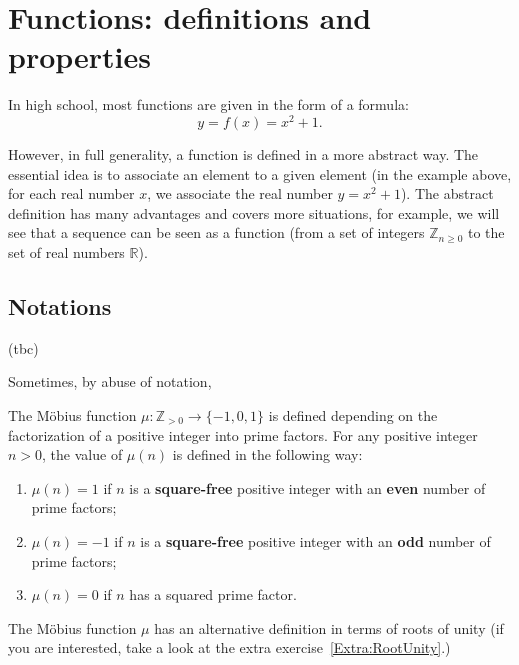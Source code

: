 \documentclass[
	fontsize=10pt, %
	twoside=true, %
	secnumdepth=1, %
	numbers=noenddot, %
]{kaobook}
\begin{document}

\chapter{Functions: definitions and properties}
In high school, most functions are given in the form of a formula:
\begin{equation*}
y=f(x)=x^{2}+1.
\end{equation*}

However, in full generality, a function is defined in a more abstract way. The essential idea is to associate an element to a given element (in the example above, for each real number $x$, we associate the real number $y=x^2+1$). The abstract definition has many advantages and covers more situations, for example, we will see that a sequence can be seen as a function (from a set of integers $\mathbb{Z}_{n\geq 0}$ to the set of real numbers $\mathbb{R}$).

\section{Notations}

(tbc)

Sometimes, by abuse of notation,

\begin{example}
The Möbius function $\mu:\mathbb{Z}_{>0}\to\{-1,0,1\}$ is defined depending on the factorization of a positive integer into prime factors. For any positive integer $n>0$, the value of $\mu(n)$ is defined in the following way:
\begin{enumerate}
	\item $\mu(n)=1$ if $n$ is a \textbf{square-free} positive integer with an \textbf{even} number of prime factors;
	\item $\mu(n)=-1$ if $n$ is a \textbf{square-free} positive integer with an \textbf{odd} number of prime factors;
	\item $\mu(n)=0$ if $n$ has a squared prime factor.
\end{enumerate}
The Möbius function $\mu$ has an alternative definition in terms of roots of unity (if you are interested, take a look at the extra exercise~\ref{Extra:RootUnity}.)
\end{example}
\end{document}
